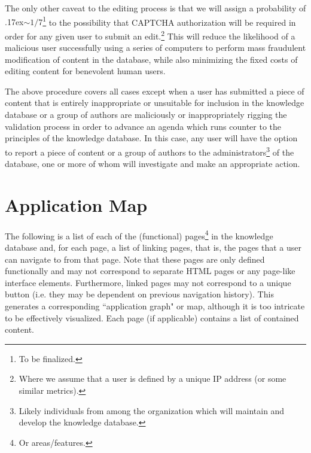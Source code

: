 \documentclass[12pt,letterpaper]{article}
\begin{document}
The only other caveat to the editing process is that we will assign a probability of {\raise.17ex\hbox{$\scriptstyle\mathtt{\sim}$}}$1/7$\footnote{To be finalized.} to the possibility that CAPTCHA authorization will be required in order for any given user to submit an edit.\footnote{Where we assume that a user is defined by a unique IP address (or some similar metrics).} This will reduce the likelihood of a malicious user successfully using a series of computers to perform mass fraudulent modification of content in the database, while also minimizing the fixed costs of editing content for benevolent human users.

The above procedure covers all cases except when a user has submitted a piece of content that is entirely inappropriate or unsuitable for inclusion in the knowledge database or a group of authors are maliciously or inappropriately rigging the validation process in order to advance an agenda which runs counter to the principles of the knowledge database. In this case, any user will have the option to report a piece of content or a group of authors to the administrators\footnote{Likely individuals from among the organization which will maintain and develop the knowledge database.} of the database, one or more of whom will investigate and make an appropriate action. 






\section{Application Map}

The following is a list of each of the (functional) pages\footnote{Or areas/features.} in the knowledge database and, for each page, a list of linking pages, that is, the pages that a user can navigate to from that page. Note that these pages are only defined functionally and may not correspond to separate HTML pages or any page-like interface elements. Furthermore, linked pages may not correspond to a unique button (i.e. they may be dependent on previous navigation history). This generates a corresponding ``application graph" or map, although it is too intricate to be effectively visualized. Each page (if applicable) contains a list of contained content.
\end{document}
